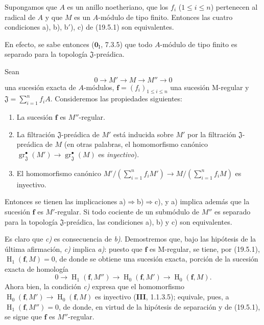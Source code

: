 \begin{corollary}[19.5.2]
\label{IV.19.5.2}
Supongamos que $A$ es un anillo noetheriano, que los $f_i$ \textup{($1\leq i\leq n$)} pertenecen al radical de $A$ y que $M$ es un $A$-módulo de tipo finito. Entonces las cuatro condiciones \textup{a), b), b$'$), c)} de \textup{(19.5.1)} son equivalentes.
\end{corollary}

En efecto, se sabe entonces ($\mathbf{0}_{\mathrm I}$, 7.3.5) que todo $A$-módulo de tipo finito es separado para la topología $\mathfrak J$-preádica.

\begin{proposition}[19.5.3]
\label{IV.19.5.3}
Sean
\[
  0\longrightarrow M'\longrightarrow M\longrightarrow M''\longrightarrow0
\]
una sucesión exacta de $A$-módulos, $\mathbf f=(f_i)_{1\leq i\leq n}$ una sucesión M-regular y $\mathfrak J=\sum_{i=1}^n f_iA$. Consideremos las propiedades siguientes:
\begin{enumerate}
  \item[\textup{a)}] La sucesión $\mathbf f$ es $M''$-regular.
  \item[\textup{b)}] La filtración $\mathfrak J$-preádica de $M'$ está inducida sobre $M'$ por la filtración $\mathfrak J$-preádica de $M$ \textup{(en otras palabras, el homomorfismo canónico $\operatorname{gr}_{\mathfrak J}^\bullet(M')\to\operatorname{gr}_{\mathfrak J}^\bullet(M)$ es \emph{inyectivo})}.
  \item[\textup{c)}] El homomorfismo canónico $M'/(\sum_{i=1}^n f_iM')\to M/(\sum_{i=1}^n f_iM)$ es inyectivo.
\end{enumerate}
Entonces se tienen las implicaciones \textup{a)}$\Rightarrow$\textup{b)}$\Rightarrow$\textup{c)}, y \textup{a)} implica además que la sucesión $\mathbf f$ es $M'$-regular. Si todo cociente de un submódulo de $M''$ es separado para la topología $\mathfrak J$-preádica, las condiciones \textup{a)}, \textup{b)} y \textup{c)} son equivalentes.
\end{proposition}

Es claro que \emph{c)} es consecuencia de \emph{b)}. Demostremos que, bajo las hipótesis de la última afirmación, \emph{c)} implica \emph{a)}: puesto que $\mathbf f$ es M-regular, se tiene, por (19.5.1), $\operatorname{H}_1(\mathbf f,M)=0$, de donde se obtiene una sucesión exacta, porción de la sucesión exacta de homología
\[
  0\longrightarrow\operatorname{H}_1(\mathbf f,M'')\longrightarrow\operatorname{H}_0(\mathbf f,M')\longrightarrow\operatorname{H}_0(\mathbf f,M).
\]
Ahora bien, la condición \emph{c)} expresa que el homomorfismo $\operatorname{H}_0(\mathbf f,M')\to\operatorname{H}_0(\mathbf f,M)$ es inyectivo (\textbf{III}, 1.1.3.5); equivale, pues, a $\operatorname{H}_1(\mathbf f,M'')=0$, de donde, en virtud de la hipótesis de separación y de (19.5.1), se sigue que $\mathbf f$ es $M''$-regular.

